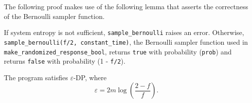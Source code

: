 \documentclass{article}
\begin{document}
\begin{tcolorbox}
\begin{note}
The following proof makes use of the following lemma that asserts the correctness of the Bernoulli sampler function.
    \begin{lemma}
    If system entropy is not sufficient, \texttt{sample\_bernoulli} raises an error. 
    Otherwise, \texttt{sample\_bernoulli(f/2, constant\_time)}, the Bernoulli sampler function used in \texttt{make\_randomized\_response\_bool}, 
    returns \texttt{true} with probability (\texttt{prob}) and returns  \texttt{false} with probability (1 - \texttt{f/2}).
    \end{lemma}
\end{note}
\end{tcolorbox}
\begin{theorem}
\label{thm:privacy-parameter}
	The program  satisfies $\varepsilon$-DP, where 
	\begin{equation*}
		\varepsilon = 2m\log\left(\frac{2-f}{f}\right).
	\end{equation*}
\end{theorem}
\end{document}
